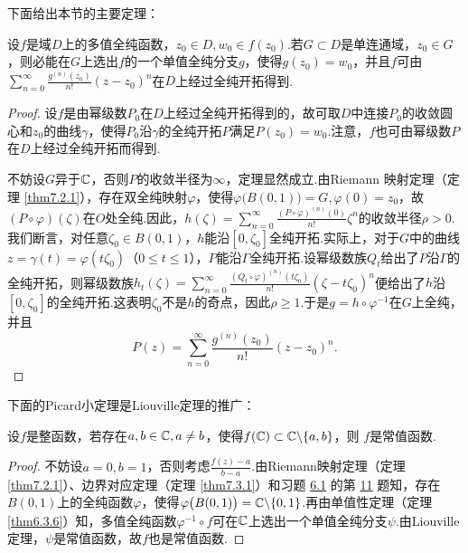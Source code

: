 下面给出本节的主要定理：
\begin{theorem}\label{thm6.3.6}
设$f$是域$D$上的多值全纯函数，$z_0\in D,w_0\in f(z_0)$.若$G\subset D$是单连通域，$z_0\in G$，则必能在$G$上选出$f$的一个单值全纯分支$g$，使得$g(z_0)=w_0$，并且$f$可由$\sum_{n=0}^\infty\frac{g^{(n)}(z_0)}{n!}(z-z_0)^n$在$D$上经过全纯开拓得到.
\end{theorem}
\begin{proof}
设$f$是由幂级数$P_0$在$D$上经过全纯开拓得到的，故可取$D$中连接$P_0$的收敛圆心和$z_0$的曲线$\gamma$，使得$P_0$沿$\gamma$的全纯开拓$P$满足$P(z_0)=w_0$.注意，$f$也可由幂级数$P$在$D$上经过全纯开拓而得到.

不妨设$G$异于$\mathbb C$，否则$P$的收敛半径为$\infty$，定理显然成立.由Riemann 映射定理（定理 \ref{thm7.2.1}），存在双全纯映射$\varphi$，使得$\varphi\big(B(0,1)\big)=G,\varphi(0)=z_0$，故$(P\circ\varphi)(\zeta)$在$O$处全纯.因此，$h(\zeta)=\sum_{n=0}^\infty\frac{(P\circ\varphi)^{(n)}(0)}{n!}\zeta^n$的收敛半径$\rho>0$.我们断言，对任意$\zeta_0\in B(0,1)$，$h$能沿$[0,\zeta_0]$全纯开拓.实际上，对于$G$中的曲线$z=\gamma(t)=\varphi(t\zeta_0)$（$0\le t\le1$），$P$能沿$\Gamma$全纯开拓.设幂级数族$Q_t$给出了$P$沿$\Gamma$的全纯开拓，则幂级数族$h_t(\zeta)=\sum_{n=0}^\infty\frac{(Q_t\circ\varphi)^{(n)}(t\zeta_0)}{n!}(\zeta-t\zeta_0)^n$便给出了$h$沿$[0,\zeta_0]$的全纯开拓.这表明$\zeta_0$不是$h$的奇点，因此$\rho\ge1$.于是$g=h\circ\varphi^{-1}$在$G$上全纯，并且
\begin{equation*}
P(z)=\sum_{n=0}^\infty\frac{g^{(n)}(z_0)}{n!}(z-z_0)^n.
\end{equation*}
\end{proof}

下面的Picard小定理是Liouville定理的推广：
\begin{theorem}\label{thm6.3.7}
设$f$是整函数，若存在$a,b\in\mathbb C,a\ne b$，使得$f(\mathbb C)\subset\mathbb C\backslash\{a,b\}$，则
$f$是常值函数.
\end{theorem}
\begin{proof}
不妨设$a=0,b=1$，否则考虑$\frac{f(z)-a}{b-a}$.由Riemann映射定理（定理 \ref{thm7.2.1}）、边界对应定理（定理 \ref{thm7.3.1}）和习题 \hyperlink{xiti6.1}{6.1} 的第 \hyperlink{xiti6.1.11}{11} 题知，存在$B(0,1)$上的全纯函数$\varphi$，使得$\varphi\big(B(0,1)\big)=\mathbb C\backslash\{0,1\}$.再由单值性定理（定理 \ref{thm6.3.6}）知，多值全纯函数$\varphi^{-1}\circ f$可在$\mathbb C$上选出一个单值全纯分支$\psi$.由Liouville定理，$\psi$是常值函数，故$f$也是常值函数.
\end{proof}

